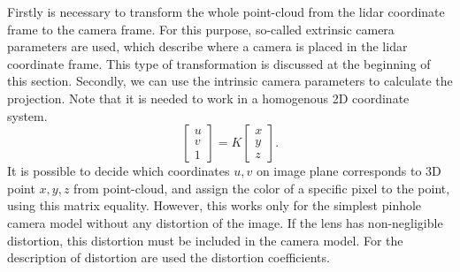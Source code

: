 Firstly is necessary to transform the whole point-cloud from the lidar coordinate frame to the camera frame. For this purpose, so-called extrinsic camera parameters are used, which describe where a camera is placed in the lidar coordinate frame. This type of transformation is discussed at the beginning of this section. Secondly, we can use the intrinsic camera parameters to calculate the projection. Note that it is needed to work in a homogenous 2D coordinate system.
\begin{equation}
\begin{bmatrix}
u\\
v\\
1
\end{bmatrix}
= K \begin{bmatrix}
x\\
y\\
z
\end{bmatrix}.
\end{equation}
It is possible to decide which coordinates $u,v$ on image plane corresponds to 3D point $x,y,z$ from point-cloud, and assign the color of a specific pixel to the point, using this matrix equality. However, this works only for the simplest pinhole camera model without any distortion of the image. If the lens has non-negligible distortion, this distortion must be included in the camera model. For the description of distortion are used the distortion coefficients.

\newpage